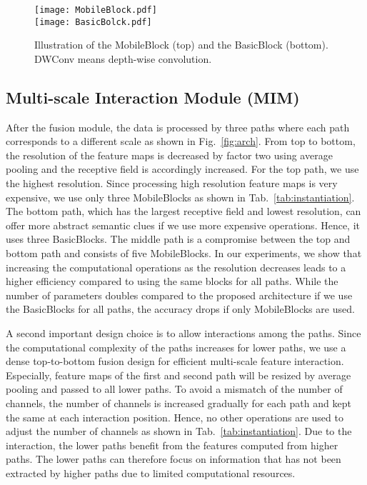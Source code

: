 \documentclass[letterpaper, 10 pt, journal, twoside]{ieeetran}
\newcommand{\figref}[1]{Fig.~\ref{#1}}
\newcommand{\tabref}[1]{Tab.~\ref{#1}}
\begin{document}
\begin{figure}[!t]
    \centering
    \texttt{[image: MobileBlock.pdf]}
    \\ \vspace{2mm}
    \texttt{[image: BasicBolck.pdf]}
    \caption{Illustration of the MobileBlock (top) and the BasicBlock (bottom). DWConv means depth-wise convolution.}
    \vspace{-6mm}
    \label{fig:blocks}
\end{figure}

\subsection{Multi-scale Interaction Module (MIM)} \label{sec:mim}
After the fusion module, the data is processed by three paths where each path corresponds to a different scale as shown in \figref{fig:arch}. From top to bottom, the resolution of the feature maps is decreased by factor two using average pooling and the receptive field is accordingly increased. For the top path, we use the highest resolution. Since processing high resolution feature maps is very expensive, we use only three MobileBlocks as shown in \tabref{tab:instantiation}. The bottom path, which has the largest receptive field and lowest resolution, can offer more abstract semantic clues if we use more expensive operations. Hence, it uses three BasicBlocks. The middle path is a compromise between the top and bottom path and consists of five MobileBlocks. In our experiments, we show that increasing the computational operations as the resolution decreases leads to a higher efficiency compared to using the same blocks for all paths. While the number of parameters doubles compared to the proposed architecture if we use the BasicBlocks for all paths, the accuracy drops if only MobileBlocks are used.      


A second important design choice is to allow interactions among the paths. 
Since the computational complexity of the paths increases for lower paths, we use a dense top-to-bottom fusion design for efficient multi-scale feature interaction. Especially, feature maps of the first and second path will be resized by average pooling and passed to all lower paths.
To avoid a mismatch of the number of channels, the number of channels is increased gradually for each path and kept the same at each interaction position. Hence, no other operations are used to adjust the number of channels as shown in \tabref{tab:instantiation}. Due to the interaction, the lower paths benefit from the features computed from higher paths. The lower paths can therefore focus on information that has not been extracted by higher paths due to limited computational resources.        
\end{document}
